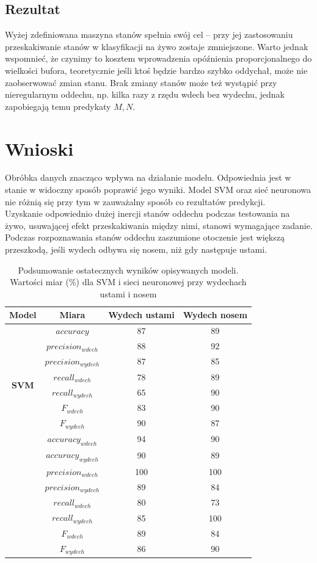 \documentclass[polish]{article}
\begin{document}
\subsection{Rezultat}
Wyżej zdefiniowana maszyna stanów spełnia swój cel -- przy jej zastosowaniu przeskakiwanie stanów w klasyfikacji na żywo zostaje zmniejszone. 
Warto jednak wspomnieć, że czynimy to kosztem wprowadzenia opóźnienia proporcjonalnego
do wielkości bufora, teoretycznie jeśli ktoś będzie bardzo szybko oddychał, może nie zaobserwować zmian stanu. Brak zmiany stanów może też wystąpić przy nieregularnym oddechu, np. kilka razy z rzędu
wdech bez wydechu, jednak zapobiegają temu predykaty $M,N$. 
\section{Wnioski}
Obróbka danych znacząco wpływa na działanie modelu. Odpowiednia jest w stanie w widoczny sposób poprawić jego wyniki. Model SVM oraz sieć neuronowa nie różnią się przy tym w zauważalny sposób co rezultatów predykcji. \\
Uzyskanie odpowiednio dużej inercji stanów oddechu podczas testowania na żywo, usuwającej efekt przeskakiwania między nimi, stanowi wymagające zadanie. \\
Podczas rozpoznawania stanów oddechu zaszumione otoczenie jest większą przeszkodą, jeśli wydech odbywa się nosem, niż gdy następuje ustami. \\
\begin{table}
\caption{Podsumowanie ostatecznych wyników opisywanych modeli. Wartości miar (\%) dla SVM i sieci neuronowej przy wydechach ustami i nosem}
\centering
\begin{tabular}{|c|c|c|c|}
	\hline
	\textbf{Model} & \textbf{Miara} & \textbf{Wydech ustami} & \textbf{Wydech nosem} \\
	\hline
	\multirow{8}{*}{\textbf{SVM}} & $accuracy$ & 87 & 89 \\
	\cline{2-4}
	& $precision_{wdech}$ & 88 & 92 \\
	\cline{2-4}
	& $precision_{wydech}$ & 87 & 85 \\
	\cline{2-4}
	& $recall_{wdech}$ & 78 & 89 \\
	\cline{2-4}
	& $recall_{wydech}$ & 65 & 90 \\
	\cline{2-4}
	& $F_{wdech}$ & 83 & 90 \\
	\cline{2-4}
	& $F_{wydech}$ & 90 & 87 \\
	\hline
	\multirow{6}{*}{\textbf{Sieć neuronowa}}
	& $accuracy_{wdech}$ & 94 & 90 \\
	\cline{2-4}
	& $accuracy_{wydech}$ & 90 & 89 \\
	\cline{2-4}
	& $precision_{wdech}$ & 100 & 100 \\
	\cline{2-4}
	& $precision_{wydech}$ & 89 & 84 \\
	\cline{2-4}
	& $recall_{wdech}$ & 80 & 73 \\
	\cline{2-4}
	& $recall_{wydech}$ & 85 & 100 \\
	\cline{2-4}
	& $F_{wdech}$ & 89 & 84 \\
	\cline{2-4}
	& $F_{wydech}$ & 86 & 90 \\
	\hline
\end{tabular}
\end{table}
\end{document}
